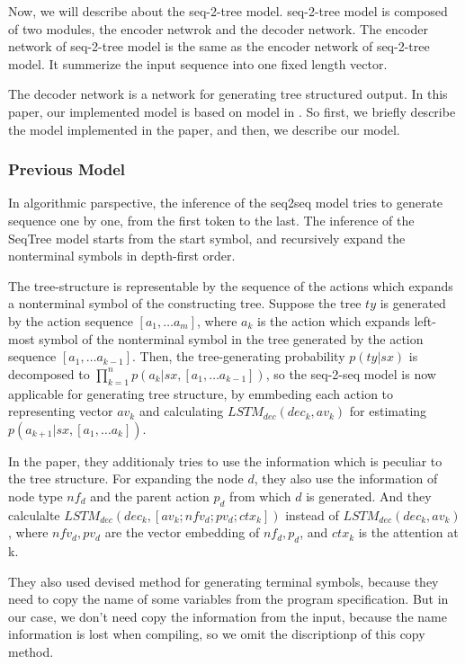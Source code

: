 \documentclass[senior,final,11pt]{iscs-thesis}
\begin{document}
Now, we will describe about the seq-2-tree model.
seq-2-tree model is composed of two modules, the encoder netwrok and the decoder network.
The encoder network of seq-2-tree model is the same as the encoder network of seq-2-tree model. It summerize the input sequence into one fixed length vector.

The decoder network is a network for generating tree structured output. 
In this paper, our implemented model is based on model in \cite{Seq2Tree}. 
So first, we briefly describe the model implemented in the paper, and then, we describe our model.

\subsubsection{Previous Model}
In algorithmic parspective, the inference of the seq2seq model tries to generate sequence one by one, from the first token to the last.
The inference of the SeqTree model starts from the start symbol, and recursively expand the nonterminal symbols in depth-first order.

The tree-structure is representable by the sequence of the actions which expands a nonterminal symbol of the constructing tree.
Suppose the tree $ty$ is generated by the action sequence $ [a_1, \dots a_m] $, 
where $ a_k $ is the action which expands left-most symbol of the nonterminal symbol in the tree generated by the action sequence $ [a_1, \dots a_{k-1}] $. 
Then, the tree-generating probability $ p(ty|sx) $ is decomposed to $ \prod_{k=1}^n p(a_k|sx,[a_1, \dots a_{k-1}]) $, 
so the seq-2-seq model is now applicable for generating tree structure, by emmbeding each action to representing vector $av_k$ and 
calculating $ LSTM_{dec}(dec_{k},av_{k}) $ for estimating $p(a_{k+1}|sx,[a_1, \dots a_{k}]) $.  

In the paper, they additionaly tries to use the information which is peculiar to the tree structure. 
For expanding the node $d$, they also use the information of node type $ nf_{d} $ and the parent action $p_{d}$ from which $d$ is generated.
And they calculalte $ LSTM_{dec}(dec_{k},[av_{k}; nfv_{d}; pv_{d}; ctx_{k}]) $ instead of $ LSTM_{dec}(dec_{k},av_{k}) $, 
where $nfv_{d},pv_{d}$ are the vector embedding of $nf_{d},p_{d}$, and $ctx_{k}$ is the attention at k.

They also used devised method for generating terminal symbols, because they need to copy the name of some variables from the program specification.
But in our case, we don't need copy the information from the input, because the name information is lost when compiling, so we omit the discriptionp of this copy method.
\end{document}
